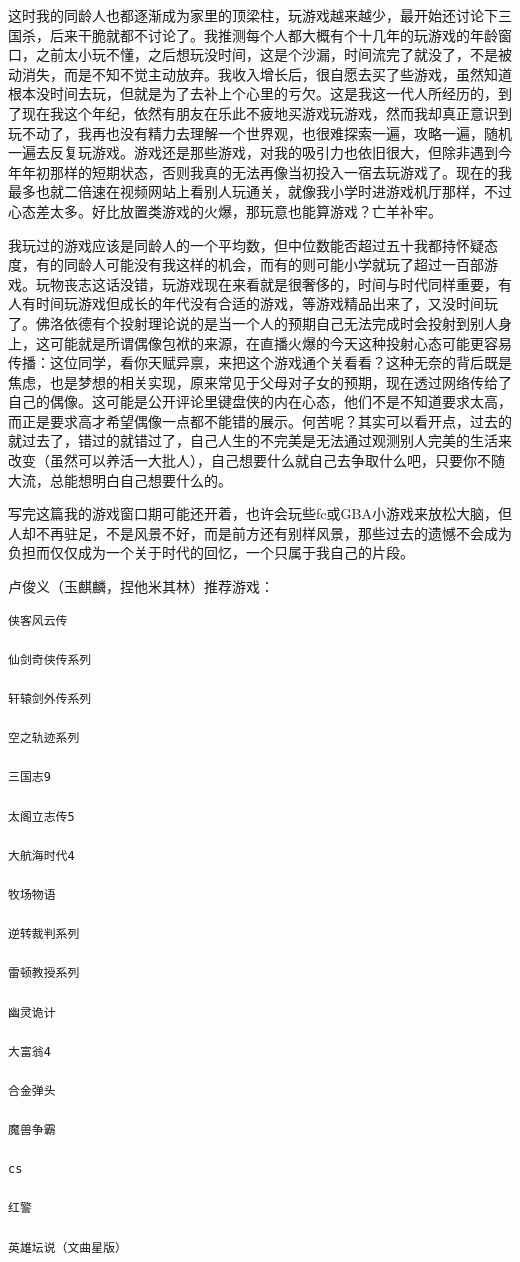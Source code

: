 \documentclass[
  letterpaper,
  DIV=11,
  numbers=noendperiod]{scrreprt}
\begin{document}
这时我的同龄人也都逐渐成为家里的顶梁柱，玩游戏越来越少，最开始还讨论下三国杀，后来干脆就都不讨论了。我推测每个人都大概有个十几年的玩游戏的年龄窗口，之前太小玩不懂，之后想玩没时间，这是个沙漏，时间流完了就没了，不是被动消失，而是不知不觉主动放弃。我收入增长后，很自愿去买了些游戏，虽然知道根本没时间去玩，但就是为了去补上个心里的亏欠。这是我这一代人所经历的，到了现在我这个年纪，依然有朋友在乐此不疲地买游戏玩游戏，然而我却真正意识到玩不动了，我再也没有精力去理解一个世界观，也很难探索一遍，攻略一遍，随机一遍去反复玩游戏。游戏还是那些游戏，对我的吸引力也依旧很大，但除非遇到今年年初那样的短期状态，否则我真的无法再像当初投入一宿去玩游戏了。现在的我最多也就二倍速在视频网站上看别人玩通关，就像我小学时进游戏机厅那样，不过心态差太多。好比放置类游戏的火爆，那玩意也能算游戏？亡羊补牢。

我玩过的游戏应该是同龄人的一个平均数，但中位数能否超过五十我都持怀疑态度，有的同龄人可能没有我这样的机会，而有的则可能小学就玩了超过一百部游戏。玩物丧志这话没错，玩游戏现在来看就是很奢侈的，时间与时代同样重要，有人有时间玩游戏但成长的年代没有合适的游戏，等游戏精品出来了，又没时间玩了。佛洛依德有个投射理论说的是当一个人的预期自己无法完成时会投射到别人身上，这可能就是所谓偶像包袱的来源，在直播火爆的今天这种投射心态可能更容易传播：这位同学，看你天赋异禀，来把这个游戏通个关看看？这种无奈的背后既是焦虑，也是梦想的相关实现，原来常见于父母对子女的预期，现在透过网络传给了自己的偶像。这可能是公开评论里键盘侠的内在心态，他们不是不知道要求太高，而正是要求高才希望偶像一点都不能错的展示。何苦呢？其实可以看开点，过去的就过去了，错过的就错过了，自己人生的不完美是无法通过观测别人完美的生活来改变（虽然可以养活一大批人），自己想要什么就自己去争取什么吧，只要你不随大流，总能想明白自己想要什么的。

写完这篇我的游戏窗口期可能还开着，也许会玩些fc或GBA小游戏来放松大脑，但人却不再驻足，不是风景不好，而是前方还有别样风景，那些过去的遗憾不会成为负担而仅仅成为一个关于时代的回忆，一个只属于我自己的片段。

卢俊义（玉麒麟，捏他米其林）推荐游戏：

\begin{verbatim}
侠客风云传

仙剑奇侠传系列

轩辕剑外传系列

空之轨迹系列

三国志9

太阁立志传5

大航海时代4

牧场物语

逆转裁判系列

雷顿教授系列

幽灵诡计

大富翁4

合金弹头

魔兽争霸

cs

红警

英雄坛说（文曲星版）
\end{verbatim}
\end{document}

